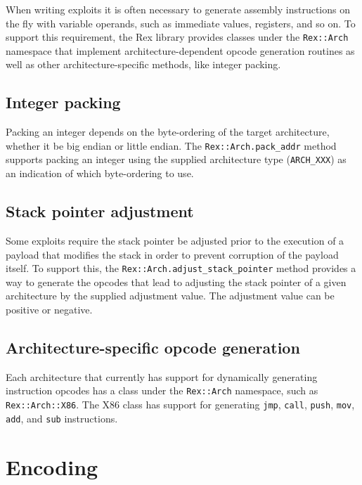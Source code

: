 \documentclass{report}
\begin{document}
\par
When writing exploits it is often necessary to generate assembly
instructions on the fly with variable operands, such as immediate
values, registers, and so on.  To support this requirement, the Rex
library provides classes under the \texttt{Rex::Arch} namespace that
implement architecture-dependent opcode generation routines as well
as other architecture-specific methods, like integer packing.

        \subsection{Integer packing}

\par
Packing an integer depends on the byte-ordering of the target
architecture, whether it be big endian or little endian.  The
\texttt{Rex::Arch.pack\_addr} method supports packing an integer
using the supplied architecture type (\texttt{ARCH\_XXX}) as an
indication of which byte-ordering to use.

        \subsection{Stack pointer adjustment}

\par
Some exploits require the stack pointer be adjusted prior to the
execution of a payload that modifies the stack in order to prevent
corruption of the payload itself.  To support this, the
\texttt{Rex::Arch.adjust\_stack\_pointer} method provides a way to
generate the opcodes that lead to adjusting the stack pointer of a
given architecture by the supplied adjustment value.  The adjustment
value can be positive or negative.

        \subsection{Architecture-specific opcode generation}

\par
Each architecture that currently has support for dynamically
generating instruction opcodes has a class under the
\texttt{Rex::Arch} namespace, such as \texttt{Rex::Arch::X86}.  The
X86 class has support for generating \texttt{jmp}, \texttt{call},
\texttt{push}, \texttt{mov}, \texttt{add}, and \texttt{sub}
instructions.

    \section{Encoding}
\end{document}
